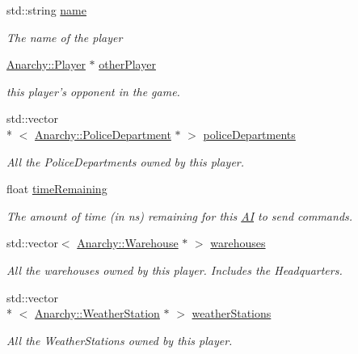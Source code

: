 \begin{DoxyCompactItemize}
std\-::string \hyperlink{classAnarchy_1_1Player_aafaac857aee9c030ae5908678eef613d}{name}
\begin{DoxyCompactList}\small\item\em The name of the player \end{DoxyCompactList}\item 
\hyperlink{classAnarchy_1_1Player}{Anarchy\-::\-Player} $\ast$ \hyperlink{classAnarchy_1_1Player_aa2cc74a91a193fb6ec24e28b3c78e2df}{other\-Player}
\begin{DoxyCompactList}\small\item\em this player's opponent in the game. \end{DoxyCompactList}\item 
std\-::vector\\*
$<$ \hyperlink{classAnarchy_1_1PoliceDepartment}{Anarchy\-::\-Police\-Department} $\ast$ $>$ \hyperlink{classAnarchy_1_1Player_a92ae92a6a0f6a491ec4ed9cd20cc598e}{police\-Departments}
\begin{DoxyCompactList}\small\item\em All the Police\-Departments owned by this player. \end{DoxyCompactList}\item 
float \hyperlink{classAnarchy_1_1Player_a242266d4bd3c79253b01173be7db0db9}{time\-Remaining}
\begin{DoxyCompactList}\small\item\em The amount of time (in ns) remaining for this \hyperlink{classAnarchy_1_1AI}{A\-I} to send commands. \end{DoxyCompactList}\item 
std\-::vector$<$ \hyperlink{classAnarchy_1_1Warehouse}{Anarchy\-::\-Warehouse} $\ast$ $>$ \hyperlink{classAnarchy_1_1Player_ae2913affe60c619b4b7d25475f677804}{warehouses}
\begin{DoxyCompactList}\small\item\em All the warehouses owned by this player. Includes the Headquarters. \end{DoxyCompactList}\item 
std\-::vector\\*
$<$ \hyperlink{classAnarchy_1_1WeatherStation}{Anarchy\-::\-Weather\-Station} $\ast$ $>$ \hyperlink{classAnarchy_1_1Player_a7738ef75a6b23b3d48a7b6084a21c59c}{weather\-Stations}
\begin{DoxyCompactList}\small\item\em All the Weather\-Stations owned by this player. \end{DoxyCompactList}\end{DoxyCompactItemize}
